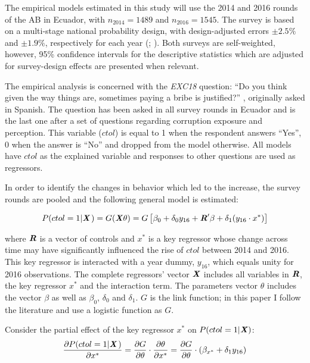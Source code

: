 \documentclass[12pt,a4]{article}
\begin{document}
The empirical models estimated in this study will use the 2014 and 2016 rounds of the AB in Ecuador, with $n_{2014}=1489$ and $n_{2016}= 1545$. The survey is based on a multi-stage national probability design, with design-adjusted errors $\pm 2.5\%$ and $\pm 1.9\%$, respectively for each year (\cite{LAPOP.2014}; \cite{LAPOP.2017}). Both surveys are self-weighted, however, 95\% confidence intervals for the descriptive statistics which are adjusted for survey-design effects are presented when relevant. 

The empirical analysis is concerned with the \emph{EXC18} question: \enquote{Do you think given the way things are, sometimes paying a bribe is justified?} \parencite[p.96]{Moscoso.2018}, originally asked in Spanish. The question has been asked in all survey rounds in Ecuador and is the last one after a set of questions regarding corruption exposure and perception. This variable ($ctol$) is equal to 1 when the respondent answers \enquote{Yes}, 0 when the answer is \enquote{No} and dropped from the model otherwise. All models have $ctol$ as the explained variable and responses to other questions are used as regressors. 

In order to identify the changes in behavior which led to the increase, the survey rounds are pooled and the following general model is estimated: 

\begin{equation}
\label{eqn:genmod}
P(ctol = 1 | \textbf{\textit{X}} \hspace{0.04cm}) = G (\textbf{\textit{X}} \theta ) = G \left[ \beta_0 + \delta_0 y_{16} + \textbf{\textit{R}}'\beta + \delta_1 (y_{16} \cdot x^*) \right]
\end{equation}

where $\textbf{\textit{R}}$ is a vector of controls and $x^*$ is a key regressor whose change across time may have significantly influenced the rise of $ctol$ between 2014 and 2016. This key regressor is interacted with a year dummy, $y_{16}$, which equals unity for 2016 observations. The complete regressors' vector $\textbf{\textit{X}}$ includes all variables in $\textbf{\textit{R}}$, the key regressor $x^*$ and the interaction term. The parameters vector $\theta$ includes the vector $\beta$ as well as $\beta_0$, $\delta_0$ and $\delta_1$. $G$ is the link function; in this paper I follow the literature and use a logistic function as $G$. 

Consider the partial effect of the key regressor $x^*$ on $P(ctol =1| \textbf{\textit{X}})$:
\begin{equation}
\label{eqn:keype}
\dfrac{\partial P(ctol = 1 | \textbf{\textit{X}} \hspace{0.04cm})}{\partial x^*} = \dfrac{\partial G}{\partial \theta} \cdot 
\dfrac{\partial \theta}{\partial x^*} = \dfrac{\partial G}{\partial \theta} \cdot (\beta_{x^*}+ \delta_1 y_{16})
\end{equation}
\end{document}
